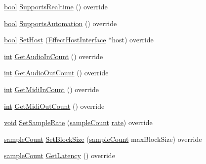 \begin{DoxyCompactItemize}
\item 
\hyperlink{mac_2config_2i386_2lib-src_2libsoxr_2soxr-config_8h_abb452686968e48b67397da5f97445f5b}{bool} \hyperlink{class_ladspa_effect_a1b74e7681ed9aa961dd358f71ec940ee}{Supports\+Realtime} () override
\item 
\hyperlink{mac_2config_2i386_2lib-src_2libsoxr_2soxr-config_8h_abb452686968e48b67397da5f97445f5b}{bool} \hyperlink{class_ladspa_effect_a016e958f5de74159f0698fd955cd6750}{Supports\+Automation} () override
\item 
\hyperlink{mac_2config_2i386_2lib-src_2libsoxr_2soxr-config_8h_abb452686968e48b67397da5f97445f5b}{bool} \hyperlink{class_ladspa_effect_ae9999e9a5d8b2d7391227bcf1a7cd93e}{Set\+Host} (\hyperlink{class_effect_host_interface}{Effect\+Host\+Interface} $\ast$host) override
\item 
\hyperlink{xmltok_8h_a5a0d4a5641ce434f1d23533f2b2e6653}{int} \hyperlink{class_ladspa_effect_ade688b5fa158b51ff41fc39d7716ef7e}{Get\+Audio\+In\+Count} () override
\item 
\hyperlink{xmltok_8h_a5a0d4a5641ce434f1d23533f2b2e6653}{int} \hyperlink{class_ladspa_effect_af80805f765f35514682bb343ad589c87}{Get\+Audio\+Out\+Count} () override
\item 
\hyperlink{xmltok_8h_a5a0d4a5641ce434f1d23533f2b2e6653}{int} \hyperlink{class_ladspa_effect_a99e60b888cd7a8587595f10eb4b1cdc8}{Get\+Midi\+In\+Count} () override
\item 
\hyperlink{xmltok_8h_a5a0d4a5641ce434f1d23533f2b2e6653}{int} \hyperlink{class_ladspa_effect_a44a01d11a14cb78562af823b31ce762c}{Get\+Midi\+Out\+Count} () override
\item 
\hyperlink{sound_8c_ae35f5844602719cf66324f4de2a658b3}{void} \hyperlink{class_ladspa_effect_a8019e358ed6ac77d1062cbb2ad139aec}{Set\+Sample\+Rate} (\hyperlink{include_2audacity_2_types_8h_afa427e1f521ea5ec12d054e8bd4d0f71}{sample\+Count} \hyperlink{seqread_8c_ad89d3fac2deab7a9cf6cfc8d15341b85}{rate}) override
\item 
\hyperlink{include_2audacity_2_types_8h_afa427e1f521ea5ec12d054e8bd4d0f71}{sample\+Count} \hyperlink{class_ladspa_effect_a6942b19cff10bea6b88cd2dc1ea2671b}{Set\+Block\+Size} (\hyperlink{include_2audacity_2_types_8h_afa427e1f521ea5ec12d054e8bd4d0f71}{sample\+Count} max\+Block\+Size) override
\item 
\hyperlink{include_2audacity_2_types_8h_afa427e1f521ea5ec12d054e8bd4d0f71}{sample\+Count} \hyperlink{class_ladspa_effect_a785fa89ddcc15a2b0d88e8e2d80fb4c1}{Get\+Latency} () override
\item 

\end{DoxyCompactItemize}
